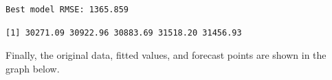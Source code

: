 \documentclass[
  11pt,
  a4paper,
  DIV=11,
  numbers=noendperiod]{scrartcl}
\newenvironment{Shaded}{\begin{snugshade}}{\end{snugshade}}
\newcommand{\FunctionTok}[1]{\textcolor[rgb]{0.28,0.35,0.67}{#1}}
\newcommand{\NormalTok}[1]{\textcolor[rgb]{0.00,0.23,0.31}{#1}}
\newcommand{\SpecialCharTok}[1]{\textcolor[rgb]{0.37,0.37,0.37}{#1}}
\begin{document}
\begin{verbatim}
Best model RMSE: 1365.859 
\end{verbatim}

\begin{Shaded}
\end{Shaded}

\begin{verbatim}
[1] 30271.09 30922.96 30883.69 31518.20 31456.93
\end{verbatim}

Finally, the original data, fitted values, and forecast points are shown
in the graph below.
\end{document}
